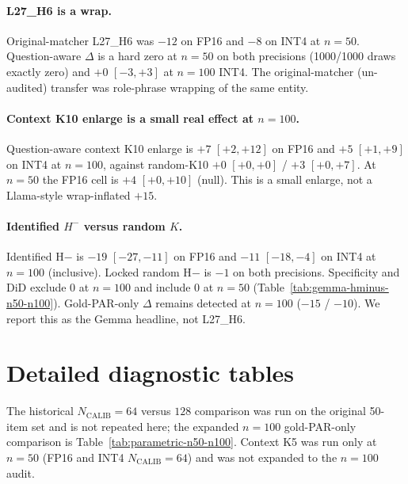 \documentclass{article} %
\begin{document}
\paragraph{L27\_H6 is a wrap.}
Original-matcher L27\_H6 was $-12$ on FP16 and $-8$ on INT4 at $n{=}50$. Question-aware $\Delta$ is a hard zero at $n{=}50$ on both precisions (1000/1000 draws exactly zero) and $+0$ $[-3,+3]$ at $n{=}100$ INT4. The original-matcher (un-audited) transfer was role-phrase wrapping of the same entity.

\paragraph{Context K10 enlarge is a small real effect at $n{=}100$.}
Question-aware context K10 enlarge is $+7$ $[+2,+12]$ on FP16 and $+5$ $[+1,+9]$ on INT4 at $n{=}100$, against random-K10 $+0$ $[+0,+0]$ / $+3$ $[+0,+7]$. At $n{=}50$ the FP16 cell is $+4$ $[+0,+10]$ (null). This is a small enlarge, not a Llama-style wrap-inflated $+15$.

\paragraph{Identified $H^{-}$ versus random $K$.}
Identified H$-$ is $-19$ $[-27,-11]$ on FP16 and $-11$ $[-18,-4]$ on INT4 at $n{=}100$ (inclusive). Locked random H$-$ is $-1$ on both precisions. Specificity and DiD exclude 0 at $n{=}100$ and include 0 at $n{=}50$ (Table~\ref{tab:gemma-hminus-n50-n100}). Gold-PAR-only $\Delta$ remains detected at $n{=}100$ ($-15$ / $-10$). We report this as the Gemma headline, not L27\_H6.

\section{Detailed diagnostic tables}
\label{app:diagnostics}

The historical $N_{\mathrm{CALIB}}{=}64$ versus $128$ comparison was run on the original 50-item set and is not repeated here; the expanded $n{=}100$ gold-PAR-only comparison is Table~\ref{tab:parametric-n50-n100}. Context K5 was run only at $n{=}50$ (FP16 and INT4 $N_{\mathrm{CALIB}}{=}64$) and was not expanded to the $n{=}100$ audit.
\end{document}
